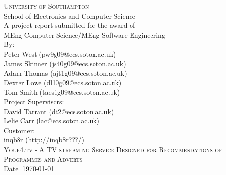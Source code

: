 
\begin{titlepage}

\begin{center}

\textsc{\large{University of Southampton}}\\[0.0cm]

\large{School of Electronics and Computer Science}\\[2.0cm]

\large{A project report submitted for the award of}\\[0.0cm]

\large{MEng Computer Science/MEng Software Engineering}\\[2.0cm]

\large{
	By: \\
	Peter West (pw9g09@ecs.soton.ac.uk) \\
	James Skinner (js40g09@ecs.soton.ac.uk) \\
	Adam Thomas (ajt1g09@ecs.soton.ac.uk) \\
	Dexter Lowe (dl10g09@ecs.soton.ac.uk) \\
	Tom Smith (taes1g09@ecs.soton.ac.uk)}\\[2.0cm]

\large{Project Supervisors: \\
		David Tarrant (dt2@ecs.soton.ac.uk) \\
		Lelie Carr (lac@ecs.soton.ac.uk)}\\[1.0cm]

\large{Customer: \\
		inqb8r (http://inqb8r???/)}\\[1.0cm]

\textsc{\large Your4.tv - A TV streaming Service Designed for Recommendations of Programmes and Adverts}\\[3.5cm]

\large{Date: \today}\\[4.0cm]

\end{center}

\end{titlepage}

